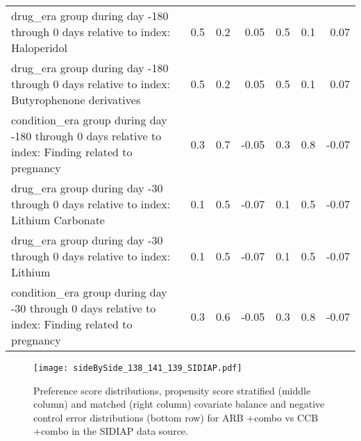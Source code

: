 \documentclass[11pt,]{article}
\begin{document}
\begin{longtable}{p{30em}rrrrrr}
  drug\_era group during day -180 through 0 days relative to index: Haloperidol & 0.5 & 0.2 & 0.05 & 0.5 & 0.1 & 0.07 \\ 
  drug\_era group during day -180 through 0 days relative to index: Butyrophenone derivatives & 0.5 & 0.2 & 0.05 & 0.5 & 0.1 & 0.07 \\ 
  condition\_era group during day -180 through 0 days relative to index: Finding related to pregnancy & 0.3 & 0.7 & -0.05 & 0.3 & 0.8 & -0.07 \\ 
  drug\_era group during day -30 through 0 days relative to index: Lithium Carbonate & 0.1 & 0.5 & -0.07 & 0.1 & 0.5 & -0.07 \\ 
  drug\_era group during day -30 through 0 days relative to index: Lithium & 0.1 & 0.5 & -0.07 & 0.1 & 0.5 & -0.07 \\ 
  condition\_era group during day -30 through 0 days relative to index: Finding related to pregnancy & 0.3 & 0.6 & -0.05 & 0.3 & 0.8 & -0.07 \\ 
  \bottomrule
\end{longtable}
\clearpage\begin{figure}[H]
    \caption{Preference score distributions,
    propensity score stratified (middle column) and matched (right column) covariate balance
    and negative control error distributions (bottom row) for
    ARB +combo vs CCB +combo in the SIDIAP data source.}
    \centerline{
        \texttt{[image: sideBySide\_138\_141\_139\_SIDIAP.pdf]}
    }
\end{figure}
\end{document}
